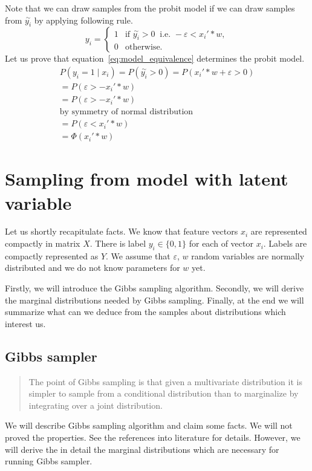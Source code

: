 Note that we can draw samples from the probit model if we can draw samples from $\overset{\sim}{y_{i}}$ by applying following rule.
\begin{equation}\label{eq:model_equivalence}
    y_i = 
     \begin{cases} 
         1 & \text{if }\overset{\sim}{y_i} > 0 \ \text{ i.e. } - \varepsilon < x_i' * w, \\
         0 &\text{otherwise.} 
     \end{cases}
\end{equation}
Let us prove that equation~\ref{eq:model_equivalence} determines the probit model.
\begin{eqnarray}
    P(y_i=1 \mid x_i)= P(\overset{\sim}{y_i} > 0 ) = P(x_i' * w + \varepsilon > 0) \\
    = P(\varepsilon > - x_i' * w) \\
    = P(\varepsilon > - x_i' * w) \\
    \text{by symmetry of normal distribution} \\
    = P(\varepsilon < x_i' * w) \\
    = \Phi(x_i' * w)
\end{eqnarray}



\section{Sampling from model with latent variable} 
\label{sec:sampling_from_model_with_latent_variable}
Let us shortly recapitulate facts. We know that feature vectors $x_i$ are represented compactly in matrix $X$. There is label $y_i \in \{0,1\}$ for each of vector $x_i$. Labels are compactly represented as $Y$. We assume that $\varepsilon$, $w$ random variables are normally distributed and we do not know parameters for $w$ yet.

Firstly, we will introduce the Gibbs sampling algorithm. Secondly, we will derive the marginal distributions needed by Gibbs sampling. Finally, at the end we will summarize what can we deduce from the samples about distributions which interest us.

\subsection*{Gibbs sampler}
\label{sub:gibbs_sampler}
\begin{quote}
The point of Gibbs sampling is that given a multivariate distribution it is simpler to sample from a conditional distribution than to marginalize by integrating over a joint distribution. \cite{wiki_gibbs}
\end{quote}
We will describe Gibbs sampling algorithm and claim some facts. We will not proved the properties. See the references into literature for details. However, we will derive the in detail the marginal distributions which are necessary for running Gibbs sampler.

